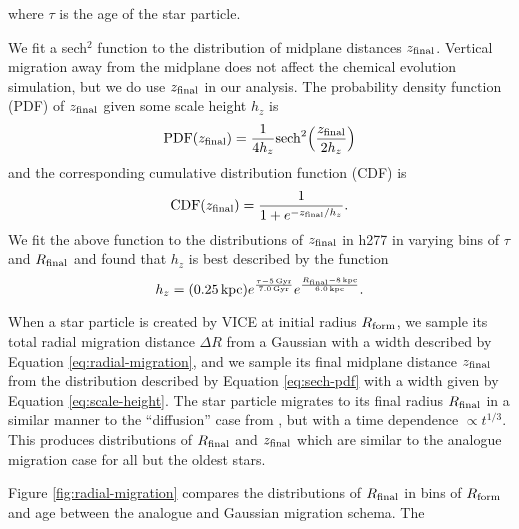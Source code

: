 \documentclass[twocolumn,linenumbers,twocolappendix]{aastex631}
\begin{document}
\noindent where $\tau$ is the age of the star particle. 

We fit a sech$^2$ function \citep{Spitzer1942} to the distribution of midplane distances $z_{\rm final}$. Vertical migration away from the midplane does not affect the chemical evolution simulation, but we do use $z_{\rm final}$ in our analysis. The probability density function (PDF) of $z_{\rm final}$ given some scale height $h_z$ is
\begin{equation}
    {\rm PDF}(z_{\rm final}) = \frac{1}{4 h_z} {\rm sech}^2\Big(\frac{z_{\rm final}}{2 h_z}\Big)
    \label{eq:sech-pdf}
\end{equation}
and the corresponding cumulative distribution function (CDF) is
\begin{equation}
    {\rm CDF}(z_{\rm final}) = \frac{1}{1 + e^{-z_{\rm final} / h_z}}.
    \label{eq:sech-cdf}
\end{equation}
We fit the above function to the distributions of $z_{\rm final}$ in h277 in varying bins of $\tau$ and $R_{\rm final}$ and found that $h_z$ is best described by the function
\begin{equation}
    h_z = (0.25\,{\rm kpc}) 
    e^{\frac{\tau-5\,{\rm Gyr}}{7.0\,{\rm Gyr}}}
    e^{\frac{R_{\rm final}-8\,{\rm kpc}}{6.0\,{\rm kpc}}}.
    \label{eq:scale-height}
\end{equation}

When a star particle is created by VICE at initial radius $R_{\rm form}$, we sample its total radial migration distance $\Delta R$ from a Gaussian with a width described by Equation \ref{eq:radial-migration}, and we sample its final midplane distance $z_{\rm final}$ from the distribution described by Equation \ref{eq:sech-pdf} with a width given by Equation \ref{eq:scale-height}. The star particle migrates to its final radius $R_{\rm final}$ in a similar manner to the ``diffusion'' case from \citet{Johnson2021-Migration}, but with a time dependence $\propto t^{1/3}$. This produces distributions of $R_{\rm final}$ and $z_{\rm final}$ which are similar to the analogue migration case for all but the oldest stars. 

Figure \ref{fig:radial-migration} compares the distributions of $R_{\rm final}$ in bins of $R_{\rm form}$ and age between the analogue and Gaussian migration schema. The 
\end{document}
